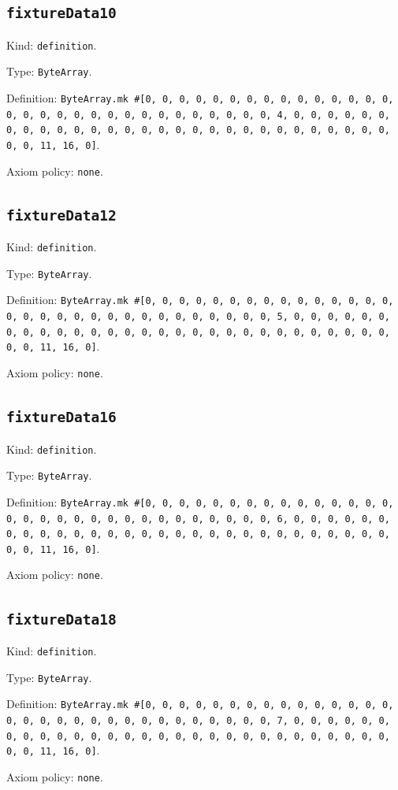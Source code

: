\documentclass[11pt]{article}
\begin{document}
\subsection*{\texttt{fixtureData10}}
\noindent Kind: \texttt{definition}.\par
\noindent Type: \texttt{ByteArray}.\par
\noindent Definition: \texttt{ByteArray.mk \#[0, 0, 0, 0, 0, 0, 0, 0, 0, 0, 0, 0, 0, 0, 0, 0, 0, 0, 0, 0, 0, 0, 0, 0, 0, 0, 0, 0, 0, 0, 0, 4, 0, 0, 0, 0, 0, 0, 0, 0, 0, 0, 0, 0, 0, 0, 0, 0, 0, 0, 0, 0, 0, 0, 0, 0, 0, 0, 0, 0, 0, 0, 0, 11, 16, 0]}.\par
\noindent Axiom policy: \texttt{none}.\par
\subsection*{\texttt{fixtureData12}}
\noindent Kind: \texttt{definition}.\par
\noindent Type: \texttt{ByteArray}.\par
\noindent Definition: \texttt{ByteArray.mk \#[0, 0, 0, 0, 0, 0, 0, 0, 0, 0, 0, 0, 0, 0, 0, 0, 0, 0, 0, 0, 0, 0, 0, 0, 0, 0, 0, 0, 0, 0, 0, 5, 0, 0, 0, 0, 0, 0, 0, 0, 0, 0, 0, 0, 0, 0, 0, 0, 0, 0, 0, 0, 0, 0, 0, 0, 0, 0, 0, 0, 0, 0, 0, 11, 16, 0]}.\par
\noindent Axiom policy: \texttt{none}.\par
\subsection*{\texttt{fixtureData16}}
\noindent Kind: \texttt{definition}.\par
\noindent Type: \texttt{ByteArray}.\par
\noindent Definition: \texttt{ByteArray.mk \#[0, 0, 0, 0, 0, 0, 0, 0, 0, 0, 0, 0, 0, 0, 0, 0, 0, 0, 0, 0, 0, 0, 0, 0, 0, 0, 0, 0, 0, 0, 0, 6, 0, 0, 0, 0, 0, 0, 0, 0, 0, 0, 0, 0, 0, 0, 0, 0, 0, 0, 0, 0, 0, 0, 0, 0, 0, 0, 0, 0, 0, 0, 0, 11, 16, 0]}.\par
\noindent Axiom policy: \texttt{none}.\par
\subsection*{\texttt{fixtureData18}}
\noindent Kind: \texttt{definition}.\par
\noindent Type: \texttt{ByteArray}.\par
\noindent Definition: \texttt{ByteArray.mk \#[0, 0, 0, 0, 0, 0, 0, 0, 0, 0, 0, 0, 0, 0, 0, 0, 0, 0, 0, 0, 0, 0, 0, 0, 0, 0, 0, 0, 0, 0, 0, 7, 0, 0, 0, 0, 0, 0, 0, 0, 0, 0, 0, 0, 0, 0, 0, 0, 0, 0, 0, 0, 0, 0, 0, 0, 0, 0, 0, 0, 0, 0, 0, 11, 16, 0]}.\par
\noindent Axiom policy: \texttt{none}.\par
\end{document}

